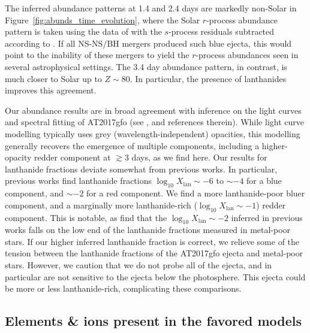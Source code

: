 \documentclass[twocolumn,twocolappendix]{aastex63}
\begin{document}
The inferred abundance patterns at 1.4 and 2.4 days are markedly non-Solar in Figure~\ref{fig:abunds_time_evolution}, where the Solar $r$-process abundance pattern is taken using the data of \cite{lodders09} with the $s$-process residuals subtracted according to \cite{bisterzo14}. If all NS-NS/BH mergers produced such blue ejecta, this would point to the inability of these mergers to yield the $r$-process abundances seen in several astrophysical settings. The 3.4 day abundance pattern, in contrast, is much closer to Solar up to $Z \sim 80$. In particular, the presence of lanthanides improves this agreement. 

Our abundance results are in broad agreement with inference on the light curves and spectral fitting of AT2017gfo (see \citealt{ji19}, and references therein). While light curve modelling typically uses grey (wavelength-independent) opacities, this modelling generally recovers the emergence of multiple components, including a higher-opacity redder component at $\gtrsim$3 days, as we find here. Our results for lanthanide fractions deviate somewhat from previous works. In particular, previous works find lanthanide fractions $\log_{10} X_{\mathrm{lan}} \sim -6$ to $\sim -4$ for a blue component, and $\sim -2$ for a red component. We find a more lanthanide-poor bluer component, and a marginally more lanthanide-rich ($\log_{10} X_{\mathrm{lan}} \sim -1$) redder component. This is notable, as \cite{ji19} find that the $\log_{10} X_{\mathrm{lan}} \sim -2$ inferred in previous works falls on the low end of the lanthanide fractions measured in metal-poor stars. If our higher inferred lanthanide fraction is correct, we relieve some of the tension between the lanthanide fractions of the AT2017gfo ejecta and metal-poor stars. However, we caution that we do not probe all of the ejecta, and in particular are not sensitive to the ejecta below the photosphere. This ejecta could be more or less lanthanide-rich, complicating these comparisons.




\subsection{Elements \& ions present in the favored models}\label{ssc:disco-elements}
\end{document}
